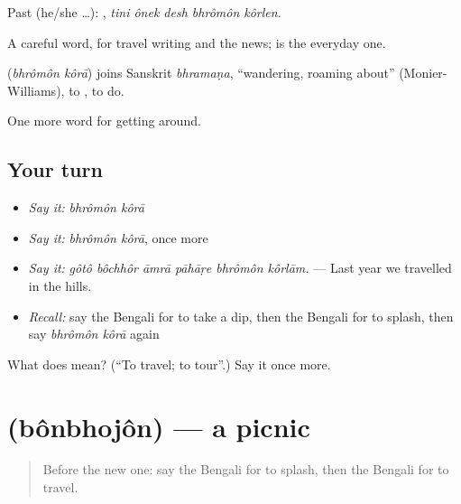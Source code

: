 Past (he/she …):     , \emph{tini ônek desh bhrômôn kôrlen}.

A careful word, for travel writing and the news;  is the everyday one.

\begin{cousinweb}
\textbf{ } (\emph{bhrômôn kôrā}) joins Sanskrit \emph{bhramaṇa}, \textquotedblleft{}wandering, roaming about\textquotedblright{} (Monier-Williams), to , to do.
\end{cousinweb}

\begin{grammarlens}[title={What you've built}]
One more word for getting around.
\end{grammarlens}

\subsection*{Your turn}
\begin{itemize}
\raggedright
  \item \emph{Say it:} \emph{bhrômôn kôrā}
  \item \emph{Say it:} \emph{bhrômôn kôrā}, once more
  \item \emph{Say it:} \emph{gôtô bôchhôr āmrā pāhāṛe bhrômôn kôrlām.} — Last year we travelled in the hills.
  \item \emph{Recall:} say the Bengali for to take a dip, then the Bengali for to splash, then say \emph{bhrômôn kôrā} again
\end{itemize}

\begin{tcolorbox}[breakable,colback=teal!4,colframe=teal!35!black,title={Before you move on}]
What does   mean? (\textquotedblleft{}To travel; to tour\textquotedblright{}.) Say it once more.
\end{tcolorbox}
\section[\texorpdfstring{\bn{বনভোজন} (bônbhojôn)}{বনভোজন (bônbhojôn)}]{ (bônbhojôn) — a picnic}

\label{lesson:BN-C399-bonbhojon}



\begin{quote}
Before the new one: say the Bengali for to splash, then the Bengali for to travel.
\end{quote}

